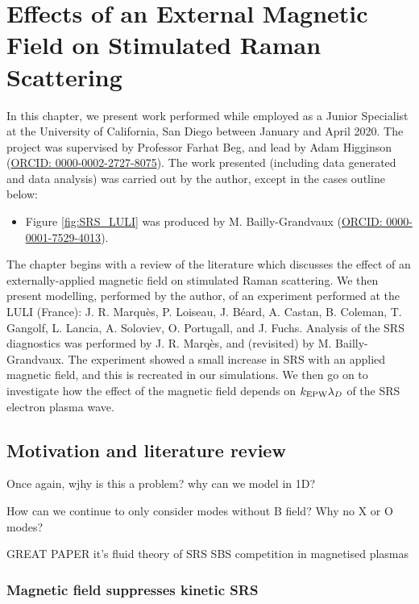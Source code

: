 \chapter{Effects of an External Magnetic Field on Stimulated Raman Scattering}
\label{chp:magSRS}

In this chapter, we present work performed while employed as a Junior Specialist at the University of California, San Diego between January and April 2020. The project was supervised by Professor Farhat Beg, and lead by Adam Higginson (\href{https://orcid.org/0000-0002-2727-8075}{ORCID: 0000-0002-2727-8075}). The work presented (including data generated and data analysis) was carried out by the author, except in the cases outline below:
\begin{itemize}
\item Figure \ref{fig:SRS_LULI} was produced by M. Bailly-Grandvaux (\href{https://orcid.org/0000-0001-7529-4013}{ORCID: 0000-0001-7529-4013}).
\end{itemize}

The chapter begins with a review of the literature which discusses the effect of an externally-applied magnetic field on stimulated Raman scattering. We then present modelling, performed by the author, of an experiment performed at the \acrlong{LULI} (France): J. R. Marqu\`es, P. Loiseau, J. B\'eard, A. Castan, B. Coleman, T. Gangolf, L. Lancia, A. Soloviev, O. Portugall, and J. Fuchs. Analysis of the SRS diagnostics was performed by J. R. Marq\`es, and (revisited) by M. Bailly-Grandvaux.  The experiment showed a small increase in SRS with an applied magnetic field, and this is recreated in our simulations. We then go on to investigate how the effect of the magnetic field depends on $k_\mathrm{EPW}\lambda_D$ of the SRS electron plasma wave.

\section{Motivation and literature review}



Once again, wjhy is this a problem? why can we model in 1D? 

How can we continue to only consider modes without B field? Why no X or O modes?

GREAT PAPER it's fluid theory of SRS SBS competition in magnetised plasmas\citep{Vyas2016}

\subsection{Magnetic field suppresses kinetic SRS}

